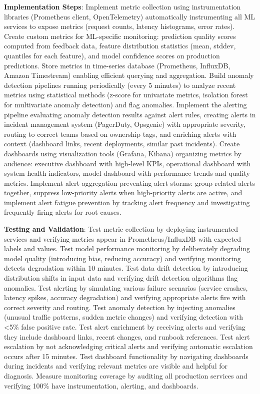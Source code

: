 \textbf{Implementation Steps}: Implement metric collection using instrumentation libraries (Prometheus client, OpenTelemetry) automatically instrumenting all ML services to expose metrics (request counts, latency histograms, error rates). Create custom metrics for ML-specific monitoring: prediction quality scores computed from feedback data, feature distribution statistics (mean, stddev, quantiles for each feature), and model confidence scores on production predictions. Store metrics in time-series database (Prometheus, InfluxDB, Amazon Timestream) enabling efficient querying and aggregation. Build anomaly detection pipelines running periodically (every 5 minutes) to analyze recent metrics using statistical methods (z-score for univariate metrics, isolation forest for multivariate anomaly detection) and flag anomalies. Implement the alerting pipeline evaluating anomaly detection results against alert rules, creating alerts in incident management system (PagerDuty, Opsgenie) with appropriate severity, routing to correct teams based on ownership tags, and enriching alerts with context (dashboard links, recent deployments, similar past incidents). Create dashboards using visualization tools (Grafana, Kibana) organizing metrics by audience: executive dashboard with high-level KPIs, operational dashboard with system health indicators, model dashboard with performance trends and quality metrics. Implement alert aggregation preventing alert storms: group related alerts together, suppress low-priority alerts when high-priority alerts are active, and implement alert fatigue prevention by tracking alert frequency and investigating frequently firing alerts for root causes.

\textbf{Testing and Validation}: Test metric collection by deploying instrumented services and verifying metrics appear in Prometheus/InfluxDB with expected labels and values. Test model performance monitoring by deliberately degrading model quality (introducing bias, reducing accuracy) and verifying monitoring detects degradation within 10 minutes. Test data drift detection by introducing distribution shifts in input data and verifying drift detection algorithms flag anomalies. Test alerting by simulating various failure scenarios (service crashes, latency spikes, accuracy degradation) and verifying appropriate alerts fire with correct severity and routing. Test anomaly detection by injecting anomalies (unusual traffic patterns, sudden metric changes) and verifying detection with <5\% false positive rate. Test alert enrichment by receiving alerts and verifying they include dashboard links, recent changes, and runbook references. Test alert escalation by not acknowledging critical alerts and verifying automatic escalation occurs after 15 minutes. Test dashboard functionality by navigating dashboards during incidents and verifying relevant metrics are visible and helpful for diagnosis. Measure monitoring coverage by auditing all production services and verifying 100\% have instrumentation, alerting, and dashboards.

